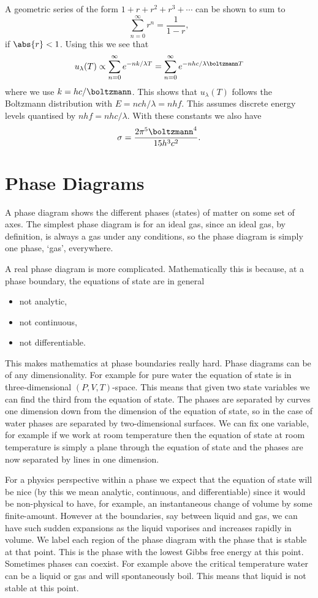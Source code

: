     A geometric series of the form \(1 + r + r^2 + r^3 + \dotsb\) can be shown to sum to
    \[\sum_{n=0}^{\infty} r^n = \frac{1}{1 - r},\]
    if \(\abs{r} < 1\).
    Using this we see that
    \[u_{\lambda}(T) \propto \sum_{n=0}^{\infty} e^{-nk/\lambda T} = \sum_{n=0}^{\infty} e^{-nhc/\lambda \boltzmann T}\]
    where we use \(k = hc/\boltzmann\).
    This shows that \(u_{\lambda}(T)\) follows the Boltzmann distribution with \(E = nch/\lambda = nhf\).
    This assumes discrete energy levels quantised by \(nhf = nhc/\lambda\).
    With these constants we also have
    \[\sigma = \frac{2\pi^5\boltzmann^4}{15 h^3 c^2}.\]
    
    
    \section{Phase Diagrams}
    A phase diagram shows the different phases (states) of matter on some set of axes.
    The simplest phase diagram is for an ideal gas, since an ideal gas, by definition, is always a gas under any conditions, so the phase diagram is simply one phase, `gas', everywhere.
    
    A real phase diagram is more complicated.
    Mathematically this is because, at a phase boundary, the equations of state are in general
    \begin{itemize}
        \item not analytic,
        \item not continuous,
        \item not differentiable.
    \end{itemize}
    This makes mathematics at phase boundaries really hard.
    Phase diagrams can be of any dimensionality.
    For example for pure water the equation of state is in three-dimensional \((P, V, T)\)-space.
    This means that given two state variables we can find the third from the equation of state.
    The phases are separated by curves one dimension down from the dimension of the equation of state, so in the case of water phases are separated by two-dimensional surfaces.
    We can fix one variable, for example if we work at room temperature then the equation of state at room temperature is simply a plane through the equation of state and the phases are now separated by lines in one dimension.
    
    For a physics perspective within a phase we expect that the equation of state will be nice (by this we mean analytic, continuous, and differentiable) since it would be non-physical to have, for example, an instantaneous change of volume by some finite-amount.
    However at the boundaries, say between liquid and gas, we can have such sudden expansions as the liquid vaporises and increases rapidly in volume.
    We label each region of the phase diagram with the phase that is stable at that point.
    This is the phase with the lowest Gibbs free energy at this point.
    Sometimes phases can coexist.
    For example above the critical temperature water can be a liquid or gas and will spontaneously boil.
    This means that liquid is not stable at this point.
    
